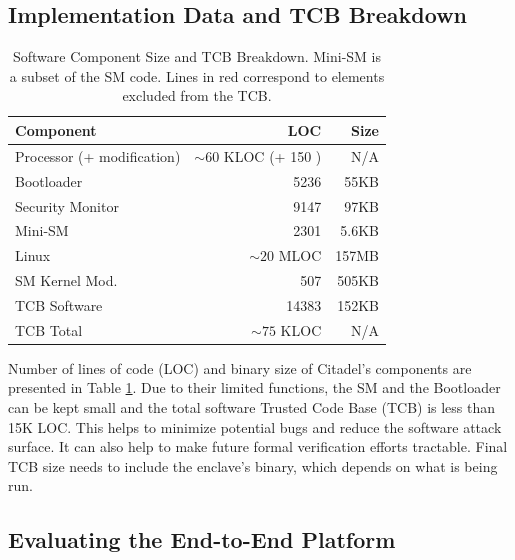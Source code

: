 \subsection{Implementation Data and TCB Breakdown}
\begin{table}
    \centering
    \begin{tabular}{|p{2.35cm}|r|r|}
        \hline
         Component & LOC & Size\\
         \hline\hline
         Processor \cite{bourgeat2019mi6} (+ modification) & $\sim60$ KLOC (+ 150 ) & N/A \\
         \hline
         Bootloader & 5236 & 55KB\\
         \hline
         Security Monitor & 9147 & 97KB\\
         \hline
         \rowcolor{LightRedbis}
         Mini-SM & 2301 & 5.6KB\\
         \hline
         \rowcolor{LightRed}
         Linux & $\sim20$ MLOC & 157MB\\
         \hline
         \rowcolor{LightRed}
         SM Kernel Mod. & 507 & 505KB\\
         \hline
         \hline
         TCB Software & 14383 & 152KB \\
         \hline
         TCB Total & $\sim75$ KLOC & N/A \\
         \hline
    \end{tabular}
    \caption{Software Component Size and TCB Breakdown. Mini-SM is a subset of the SM code. 
    Lines in red correspond to elements excluded from the TCB.}
    \label{tab:tcbloc}
\end{table}

Number of lines of code (LOC) and binary size of Citadel's components are presented in Table \ref{tab:tcbloc}.
Due to their limited functions, the SM and the Bootloader can be kept small and the total software Trusted Code Base (TCB) is less than 15K LOC.
This helps to minimize potential bugs and reduce the software attack surface.
It can also help to make future formal verification efforts tractable.
Final TCB size needs to include the enclave's binary, which depends on what is being run. 

\subsection{Evaluating the End-to-End Platform}

